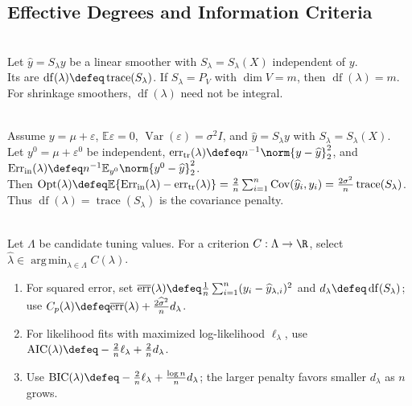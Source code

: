 \subsection{Effective Degrees and Information Criteria}
\begin{definition} \label{def:sl-effective-degrees-of-freedom} \\
Let $\widehat{y}=S_\lambda y$ be a linear smoother with $S_\lambda=S_\lambda(X)$ independent of $y$.\\
Its  are $\operatorname{df}(\lambda)\defeq\operatorname{trace}(S_\lambda)$. If $S_\lambda=P_V$ with $\dim V=m$, then $\operatorname{df}(\lambda)=m$.\\
For shrinkage smoothers, $\operatorname{df}(\lambda)$ need not be integral.
\end{definition}

\begin{remark} \label{rem:sl-training-error-optimism} \\
Assume $y=\mu+\varepsilon$, $\mathbb{E}\varepsilon=0$, $\operatorname{Var}(\varepsilon)=\sigma^2I$, and $\widehat{y}=S_\lambda y$ with $S_\lambda=S_\lambda(X)$.\\
Let $y^0=\mu+\varepsilon^0$ be independent, $\operatorname{err}_{\mathrm{tr}}(\lambda)\defeq n^{-1}\norm{y-\widehat{y}}_2^2$, and $\operatorname{Err}_{\mathrm{in}}(\lambda)\defeq n^{-1}\mathbb{E}_{y^0}\norm{y^0-\widehat{y}}_2^2$.\\
Then $\operatorname{Opt}(\lambda)\defeq\mathbb{E}\{\operatorname{Err}_{\mathrm{in}}(\lambda)-\operatorname{err}_{\mathrm{tr}}(\lambda)\}=\frac{2}{n}\sum_{i=1}^n\operatorname{Cov}(\widehat{y}_i,y_i)=\frac{2\sigma^2}{n}\operatorname{trace}(S_\lambda)$.\\
Thus $\operatorname{df}(\lambda)=\operatorname{trace}(S_\lambda)$ is the covariance penalty.
\end{remark}

\begin{method} \label{meth:sl-aic-bic-effective-df-selection} \\
Let $\Lambda$ be candidate tuning values. For a criterion $C:\Lambda\to\R$, select $\widehat{\lambda}\in\operatorname*{arg\,min}_{\lambda\in\Lambda}C(\lambda)$.
\begin{enumerate}[label=(\roman*)]
\setlength{\itemsep}{0pt}
\item For squared error, set $\overline{\operatorname{err}}(\lambda)\defeq \frac{1}{n}\sum_{i=1}^n(y_i-\widehat{y}_{\lambda,i})^2$ and $d_\lambda\defeq\operatorname{df}(S_\lambda)$; use $C_p(\lambda)\defeq\overline{\operatorname{err}}(\lambda)+\frac{2\widehat{\sigma}^2}{n}d_\lambda$.
\item For likelihood fits with maximized log-likelihood $\ell_\lambda$, use $\operatorname{AIC}(\lambda)\defeq-\frac{2}{n}\ell_\lambda+\frac{2}{n}d_\lambda$.
\item Use $\operatorname{BIC}(\lambda)\defeq-\frac{2}{n}\ell_\lambda+\frac{\log n}{n}d_\lambda$; the larger penalty favors smaller $d_\lambda$ as $n$ grows.
\end{enumerate}
\end{method}

